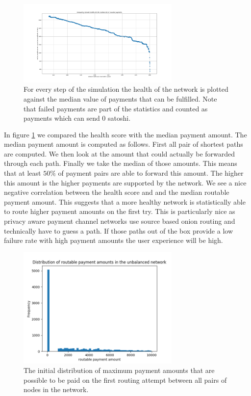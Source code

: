 \documentclass[a4paper]{paper}
\begin{document}
\begin{figure}
 \centering
 \includegraphics[width=8cm]{code/results/routabilityTest/health vs payment amt.png}
 \caption{For every step of the simulation the health of the network is plotted against the median value of payments that can be fulfilled. Note that failed payments are part of the statistics and counted as payments which can send $0$ satoshi.}
 \label{fig:healthVsPayment}
\end{figure}
In figure \ref{fig:healthVsPayment} we compared the health score with the median payment amount.
The median payment amount is computed as follows.
First all pair of shortest paths are computed.
We then look at the amount that could actually be forwarded through each path.
Finally we take the median of those amounts.
This means that at least $50\%$ of payment pairs are able to forward this amount.
The higher this amount is the higher payments are supported by the network.
We see a nice negative correlation between the health score and and the median routable payment amount.
This suggests that a more healthy network is statistically able to route higher payment amounts on the first try.
This is particularly nice as privacy aware payment channel networks use source based onion routing and technically have to guess a path. If those paths out of the box provide a low failure rate with high payment amounts the user experience will be high.

\begin{figure}
 \centering
 \includegraphics[width=8cm]{code/results/routabilityTest/paymentamtUnbalanced.png}
 \caption{The initial distribution of maximum payment amounts that are possible to be paid on the first routing attempt between all pairs of nodes in the network.}
 \label{fig:paymentUnbalanced}
\end{figure}
\end{document}
